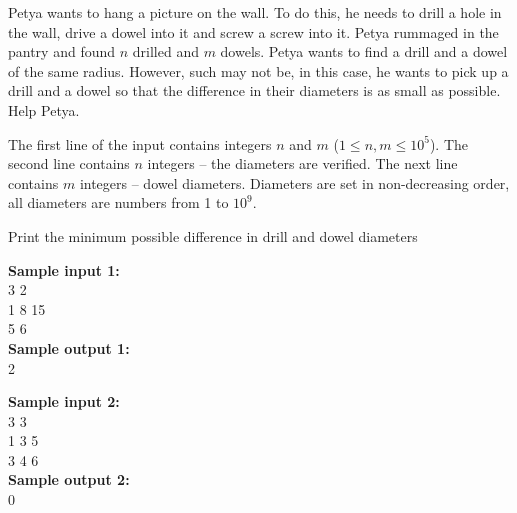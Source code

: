 \documentclass[a4paper]{article}
\begin{document}
Petya wants to hang a picture on the wall. To do this, he needs to drill a hole in the wall, drive a dowel into it and screw a screw into it. Petya rummaged in the pantry and found $n$ drilled and $m$ dowels. Petya wants to find a drill and a dowel of the same radius. However, such may not be, in this case, he wants to pick up a drill and a dowel so that the difference in their diameters is as small as possible. Help Petya.

The first line of the input contains integers $n$ and $m$ ($1 \le n, m \le 10^5$). The second line contains $n$ integers -- the diameters are verified. The next line contains $m$ integers -- dowel diameters. Diameters are set in non-decreasing order, all diameters are numbers from 1 to $10^9$.

Print the minimum possible difference in drill and dowel diameters

\LINE

\noindent \textbf{Sample input 1:}\\
3 2\\
1 8 15\\
5 6\\


\noindent \textbf{Sample output 1:}\\
2

\SPACE


\noindent \textbf{Sample input 2:}\\
3 3\\
1 3 5\\
3 4 6\\


\noindent \textbf{Sample output 2:}\\
0
\end{document}
